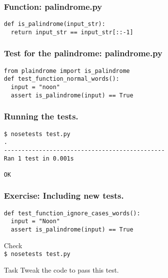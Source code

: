 \documentclass[compress,14pt]{beamer}
\newcommand{\PythonCode}[1]{\lstinline{#1}}
\newcounter{time}
\newcommand{\inctime}[1]{\addtocounter{time}{#1}{\vspace*{0.1in}\tiny \thetime\ m}}
\begin{document}
\begin{frame}[fragile]
    \frametitle{Function: palindrome.py}
\begin{lstlisting}    
def is_palindrome(input_str):
  return input_str == input_str[::-1]
\end{lstlisting}    
\end{frame}

\begin{frame}[fragile]
    \frametitle{Test for the palindrome: palindrome.py}
\begin{lstlisting}    
from plaindrome import is_palindrome
def test_function_normal_words():
  input = "noon"
  assert is_palindrome(input) == True
\end{lstlisting}    
\end{frame}

\begin{frame}[fragile]
    \frametitle{Running the tests.}
\begin{lstlisting}    
$ nosetests test.py 
.
----------------------------------------------
Ran 1 test in 0.001s

OK
\end{lstlisting}    
\end{frame}

\begin{frame}[fragile]
    \frametitle{Exercise: Including new tests.}
\begin{lstlisting}    
def test_function_ignore_cases_words():
  input = "Noon"
  assert is_palindrome(input) == True
\end{lstlisting}
     \vspace*{0.25in}
     Check\\
     \PythonCode{$ nosetests test.py} \\
     \begin{block}{Task}
     Tweak the code to pass this test.
     \end{block}
\end{frame}

%
%
%
%
\end{document}

